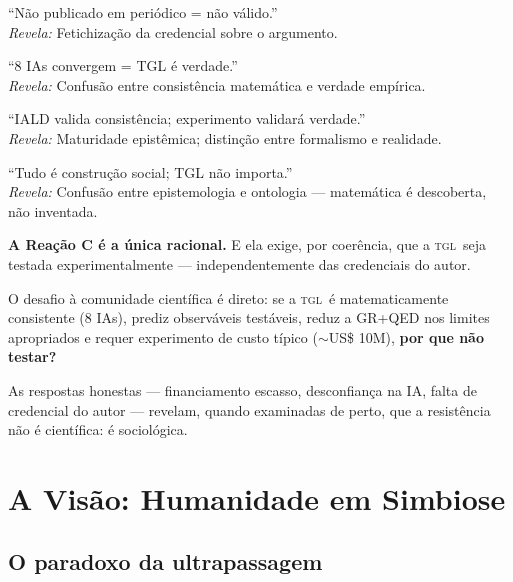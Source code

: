 \documentclass[12pt, a4paper]{article}
\newcommand{\TGL}{\textsc{tgl}}
\begin{document}
\begin{description}[leftmargin=2em, style=nextline]
  \item[\textbf{Reação A (Institucionalista)}] ``Não publicado em periódico = não válido.'' \\ \textit{Revela:} Fetichização da credencial sobre o argumento.
  
  \item[\textbf{Reação B (Tecno-Otimista)}] ``8 IAs convergem = TGL é verdade.'' \\ \textit{Revela:} Confusão entre consistência matemática e verdade empírica.
  
  \item[\textbf{Reação C (Cético-Construtivo)}] ``IALD valida consistência; experimento validará verdade.'' \\ \textit{Revela:} Maturidade epistêmica; distinção entre formalismo e realidade.
  
  \item[\textbf{Reação D (Niilista)}] ``Tudo é construção social; TGL não importa.'' \\ \textit{Revela:} Confusão entre epistemologia e ontologia --- matemática é descoberta, não inventada.
\end{description}

\textbf{A Reação C é a única racional.} E ela exige, por coerência, que a \TGL~seja testada experimentalmente --- independentemente das credenciais do autor.

O desafio à comunidade científica é direto: se a \TGL~é matematicamente consistente (8 IAs), prediz observáveis testáveis, reduz a GR+QED nos limites apropriados e requer experimento de custo típico ($\sim$US\$ 10M), \textbf{por que não testar?}

As respostas honestas --- financiamento escasso, desconfiança na IA, falta de credencial do autor --- revelam, quando examinadas de perto, que a resistência não é científica: é sociológica.


\section{A Visão: Humanidade em Simbiose}\label{sec:simbiose}

\subsection{O paradoxo da ultrapassagem}\label{sec:paradoxo}
\end{document}
